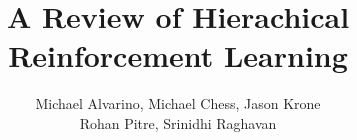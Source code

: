 \documentclass[12pt]{article}
\title{%
\textbf{A Review of Hierachical Reinforcement Learning}
}
\author{
 Michael Alvarino, Michael Chess, Jason Krone\\
 Rohan Pitre, Srinidhi Raghavan \\
}
\begin{document}
\maketitle
\bigskip





















\clearpage




\clearpage

\end{document}
